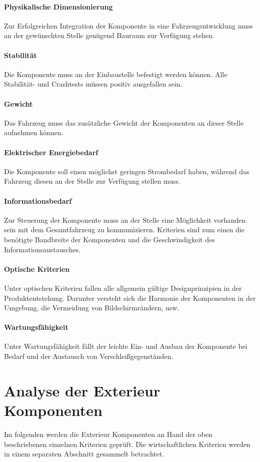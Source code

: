 \paragraph{Physikalische Dimensionierung}
Zur Erfolgreichen Integration der Komponente in eine Fahrzeugentwicklung muss an der gewünschten Stelle genügend Bauraum zur Verfügung stehen.
\paragraph{Stabilität}
Die Komponente muss an der Einbaustelle befestigt werden können. Alle Stabilität- und Crashtests müssen positiv ausgefallen sein.
\paragraph{Gewicht}
Das Fahrzeug muss das zusätzliche Gewicht der Komponenten an dieser Stelle aufnehmen können.
\paragraph{Elektrischer Energiebedarf}
Die Komponente soll einen möglichst geringen Strombedarf haben, während das Fahrzeug diesen an der Stelle zur Verfügung stellen muss.
\paragraph{Informationsbedarf}
Zur Steuerung der Komponente muss an der Stelle eine Möglichkeit vorhanden sein mit dem Gesamtfahrzeug zu kommunizieren. Kriterien sind zum einen die benötigte Bandbreite der Komponenten und die Geschwindigkeit des Informationsaustausches.
\paragraph{Optische Kriterien}
Unter optischen Kriterien fallen alle allgemein gültige Designprinzipien in der Produktentstehung. Darunter versteht sich die Harmonie der Komponenten in der Umgebung, die Vermeidung von Bildschirmrändern, usw.
\paragraph{Wartungsfähigkeit}
Unter Wartungsfähigkeit fällt der leichte Ein- und Ausbau der Komponente bei Bedarf und der Austausch von Verschleißgegenständen.

\section{Analyse der Exterieur Komponenten}
Im folgenden werden die Exterieur Komponenten an Hand der oben beschriebenen einzelnen Kriterien geprüft. Die wirtschaftlichen Kriterien werden in einem separaten Abschnitt gesammelt betrachtet. 
